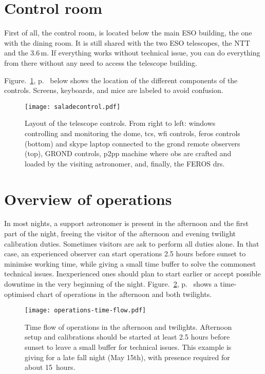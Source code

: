 \documentclass[11pt,fleqn]{book}
\def\figureref#1{Figure.~\ref{fig:#1}, p.~\pageref{fig:#1}}
\begin{document}
\section{Control room}

First of all, the control room, is located below the main ESO building, the one with the dining room.  It is still shared with the two ESO telescopes, the NTT and the 3.6\,m. If everything works without technical issue, you can do everything from there without any need to access the telescope building.

\figureref{saladecontrol}  below shows the location of the different components of the controls.  Screens, keyboards, and mice are labeled to avoid confusion.

\begin{figure}[!ht] \texttt{[image: saladecontrol.pdf]}
\caption[Layout of the telescope controls]{Layout of the telescope controls.  From right to left: \gls{windows} 
controlling and monitoring the dome, \acrlong{tcs}, \acrshort{wfi} controls,
\acrshort{feros} controls (bottom) and skype laptop connected to the \acrshort{grond}
remote observers (top), GROND controls, \acrshort{p2pp} machine where
\acrshort{ob}s are crafted and loaded by the visiting astronomer, and,
finally, the FEROS \acrlong{drs}.}
\label{fig:saladecontrol} 
\end{figure}

\section{Overview of operations}

In most nights, a support astronomer is present in the afternoon and the first part of the night, freeing the visitor of the afternoon and evening twilight calibration duties.  Sometimes visitors are ask to perform all duties alone.  In that case, an experienced observer can start operations 2.5 hours before sunset to minimise working time, while giving a small time buffer to solve the commonest technical issues.  Inexperienced ones should plan to start earlier or accept possible downtime in the very beginning of the night. \figureref{timeflow} shows a time-optimised chart of operations in the afternoon and both twilights.

\begin{figure}[!ht]
\texttt{[image: operations-time-flow.pdf]}
\caption{Time flow of operations in the afternoon and twilights. Afternoon setup and calibrations should be started at least 2.5 hours before sunset to leave a small buffer for technical issues. This example is giving for a late fall night (May 15th), with presence required for about 15~hours.}
\label{fig:timeflow}
\end{figure}
\end{document}
